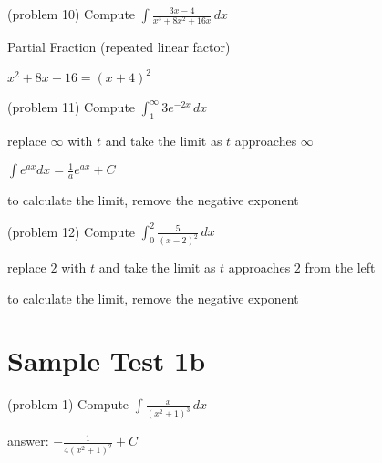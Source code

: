 \documentclass[handout]{ximera}
\begin{document}
\begin{problem}(problem 10)
Compute $\displaystyle \int \frac{3x-4}{x^3 +8x^2 +16x} \, dx$
\begin{hint}
Partial Fraction (repeated linear factor)
\end{hint}

\begin{hint}
$x^2 + 8x + 16 = (x+4)^2$
\end{hint}

\end{problem}

\begin{problem}(problem 11)
Compute $\displaystyle \int_1^\infty 3e^{-2x} \, dx$

\begin{hint}
replace $\infty$ with $t$ and take the limit as $t$ approaches $\infty$
\end{hint}

\begin{hint}
$\displaystyle \int e^{ax} dx = \frac{1}{a} e^{ax} + C$
\end{hint}

\begin{hint}
to calculate the limit, remove the negative exponent
\end{hint}

\end{problem}


\begin{problem}(problem 12)
Compute $\displaystyle \int_{0}^2 \frac{5}{(x-2)^2} \, dx$

\begin{hint}
replace $2$ with $t$ and take the limit as $t$ approaches $2$ from the left
\end{hint}


\begin{hint}
to calculate the limit, remove the negative exponent
\end{hint}


\end{problem}




\section{Sample Test 1b}

\begin{problem}(problem 1)
Compute $\displaystyle \int \frac{x}{(x^2+1)^3} \, dx$

\begin{hint}
answer: $\displaystyle -\frac{1}{4(x^2+1)^2} + C$
\end{hint}

\end{problem}
\end{document}
